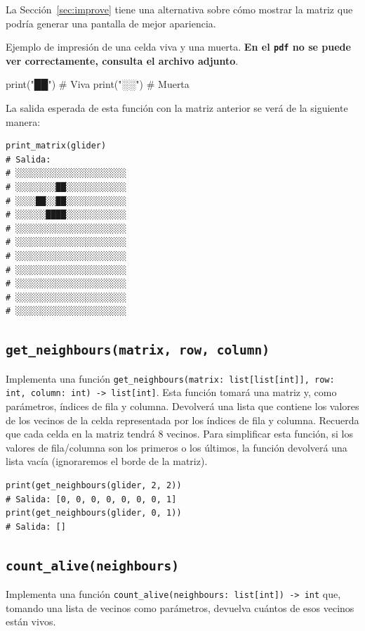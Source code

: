 \documentclass[10pt,a4paper]{article}
\begin{document}
La Sección~\ref{sec:improve} tiene una alternativa sobre cómo mostrar la matriz que podría generar una pantalla de mejor apariencia.

Ejemplo de impresión de una celda viva y una muerta. \textbf{En el \texttt{pdf} no se puede ver correctamente, consulta el archivo adjunto}.
\begin{attachedlisting}
print("██") # Viva
print("░░") # Muerta
\end{attachedlisting}

La salida esperada de esta función con la matriz anterior se verá de la siguiente manera:

\begin{lstlisting}
print_matrix(glider)
# Salida: 
# ░░░░░░░░░░░░░░░░░░░░░░
# ░░░░░░░░██░░░░░░░░░░░░
# ░░░░██░░██░░░░░░░░░░░░
# ░░░░░░████░░░░░░░░░░░░
# ░░░░░░░░░░░░░░░░░░░░░░
# ░░░░░░░░░░░░░░░░░░░░░░
# ░░░░░░░░░░░░░░░░░░░░░░
# ░░░░░░░░░░░░░░░░░░░░░░
# ░░░░░░░░░░░░░░░░░░░░░░
# ░░░░░░░░░░░░░░░░░░░░░░
# ░░░░░░░░░░░░░░░░░░░░░░
\end{lstlisting}

\subsection{\texttt{get\_neighbours(matrix, row, column)}}

Implementa una función \lstinline|get_neighbours(matrix: list[list[int]], row: int, column: int) -> list[int]|. Esta función tomará una matriz y, como parámetros, índices de fila y columna. Devolverá una lista que contiene los valores de los vecinos de la celda representada por los índices de fila y columna. Recuerda que cada celda en la matriz tendrá 8 vecinos. Para simplificar esta función, si los valores de fila/columna son los primeros o los últimos, la función devolverá una lista vacía (ignoraremos el borde de la matriz).

\begin{lstlisting}
print(get_neighbours(glider, 2, 2))
# Salida: [0, 0, 0, 0, 0, 0, 0, 1]
print(get_neighbours(glider, 0, 1))
# Salida: []
\end{lstlisting}

\subsection{\texttt{count\_alive(neighbours)}}

Implementa una función \lstinline|count_alive(neighbours: list[int]) -> int| que, tomando una lista de vecinos como parámetros, devuelva cuántos de esos vecinos están vivos.
\end{document}
